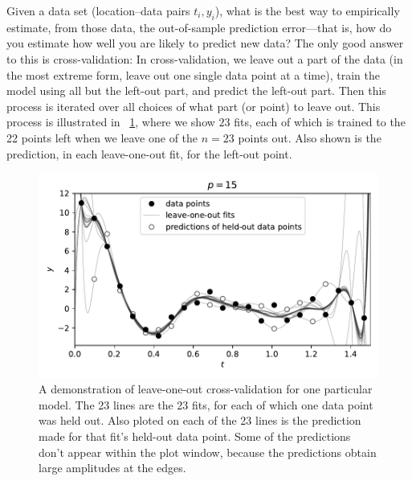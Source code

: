 \documentclass[12pt,letterpaper]{article}
\newlength{\figurewidth}
\begin{document}
Given a data set (location--data pairs $t_i, y_i$), what is the best way to empirically estimate, from those data, the out-of-sample prediction error---that is, how do you estimate how well you are likely to predict new data?
The only good answer to this is cross-validation:
In cross-validation, we leave out a part of the data (in the most extreme form, leave out one single data point at a time), train the model using all but the left-out part, and predict the left-out part. Then this process is iterated over all choices of what part (or point) to leave out.
This process is illustrated in \figurename~\ref{fig:loo}, where we show $23$ fits, each of which is trained to the 22 points left when we leave one of the $n=23$ points out.
Also shown is the prediction, in each leave-one-out fit, for the left-out point.
\begin{figure}[t]
    \begin{mdframed}
    \includegraphics[width=\figurewidth]{paper/LOO.pdf}
    \caption{A demonstration of leave-one-out cross-validation for one particular model. The 23 lines are the 23 fits, for each of which one data point was held out. Also ploted on each of the 23 lines is the prediction made for that fit's held-out data point. Some of the predictions don't appear within the plot window, because the predictions obtain large amplitudes at the edges.}
    \label{fig:loo}
    \end{mdframed}
\end{figure}
\end{document}
